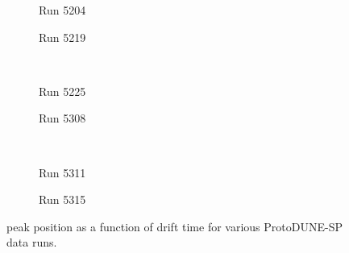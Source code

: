 \begin{figure}[h]
	\centering
	\begin{subfigure}[t]{.49\textwidth}
		\begin{adjustbox}{max totalsize=\linewidth, center}
			
		\end{adjustbox}
		\caption{Run 5204}
	\end{subfigure}
	\hfill
	\begin{subfigure}[t]{.49\textwidth}
		\begin{adjustbox}{max totalsize=\linewidth, center}
			
		\end{adjustbox}
		\caption{Run 5219}
	\end{subfigure}
	\\
	\begin{subfigure}[t]{.49\textwidth}
		\begin{adjustbox}{max totalsize=\linewidth, center}
			
		\end{adjustbox}
		\caption{Run 5225}
	\end{subfigure}
	\hfill
	\begin{subfigure}[t]{.49\textwidth}
		\begin{adjustbox}{max totalsize=\linewidth, center}
			
		\end{adjustbox}
		\caption{Run 5308}
	\end{subfigure}
	\\
	\begin{subfigure}[t]{.49\textwidth}
		\begin{adjustbox}{max totalsize=\linewidth, center}
			
		\end{adjustbox}
		\caption{Run 5311}
	\end{subfigure}
	\hfill
	\begin{subfigure}[t]{.49\textwidth}
		\begin{adjustbox}{max totalsize=\linewidth, center}
			
		\end{adjustbox}
		\caption{Run 5315}
	\end{subfigure} 
	\caption[\dqdx peak position as a function of drift time for various ProtoDUNE-SP data runs]{\dqdx peak position as a function of drift time for various ProtoDUNE-SP data runs.}
	\label{fig:dqdxPeak1}
\end{figure}

